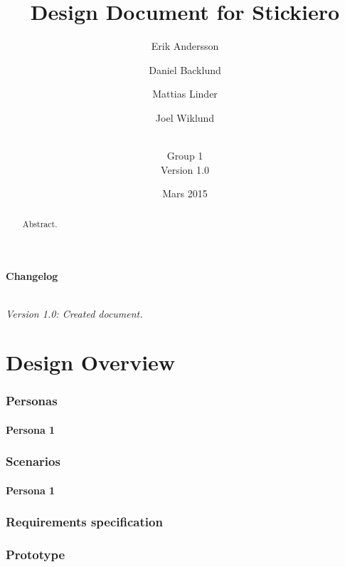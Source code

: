 \documentclass{article}
\title{Design Document for Stickiero}
\author{Erik Andersson \and Daniel Backlund \and Mattias Linder \and Joel Wiklund\and \\Group 1\\Version 1.0}
\date{Mars 2015}
\begin{document}
\maketitle
\clearpage

\begin{abstract}
  Abstract.
\end{abstract}
\tableofcontents

\subsection*{Changelog}
\paragraph{}
\em{}Version 1.0:\em{} Created document.\\ 
\clearpage

\part{Design Overview}
\section{Personas}
\label{sec:label}
\subsection{Persona 1}

\section{Scenarios}
\label{sec:label}
\subsection{Persona 1}
\section{Requirements specification}

\clearpage
\section{Prototype}
\iffalse
\begin{figure}[h!]
\centering
\frame{\texttt{[image: mockup\_small.png]}}
\caption{Prototype mockup}
\label{fig:mockup}
\end{figure}
\fi
\end{document}
